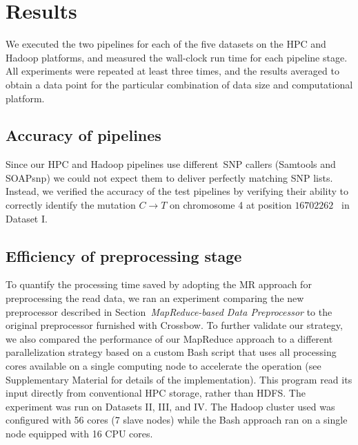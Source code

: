 \documentclass[10pt]{article}
\begin{document}
\section*{Results}


We executed the two pipelines for each of the five 
datasets on the HPC and Hadoop platforms, and measured the wall-clock run time for each pipeline stage.  
All experiments were repeated at least three times, 
and the results averaged to obtain a data point for the
particular combination of data size and computational platform.

\subsection*{Accuracy of pipelines}
Since our HPC and Hadoop pipelines use different~SNP callers (Samtools and
SOAPsnp) we could not expect them to deliver perfectly
matching SNP lists. Instead, we verified the accuracy of the test pipelines by
verifying their ability to correctly identify the mutation $C\rightarrow T$ on
chromosome 4 at position $16702262$~\cite{schneeberger} in Dataset I.



\subsection*{Efficiency of preprocessing stage}

To quantify the processing time saved by adopting the MR approach for
preprocessing the read data, we ran an
experiment comparing the new preprocessor described in
Section~{\it MapReduce-based Data Preprocessor} to the original preprocessor furnished with
Crossbow.  To further validate our strategy, we also compared the performance of
our MapReduce approach to a different parallelization strategy based on a custom Bash script
that uses all processing cores available on a single computing node to accelerate the operation (see
Supplementary Material for details of the implementation). This program read its
input directly from conventional HPC storage, rather than HDFS\@.  The experiment
was run on Datasets II, III, and IV\@.  The Hadoop cluster used was configured
with 56 cores (7 slave nodes) while the Bash approach ran on a single node
equipped with 16 CPU cores.
\end{document}
